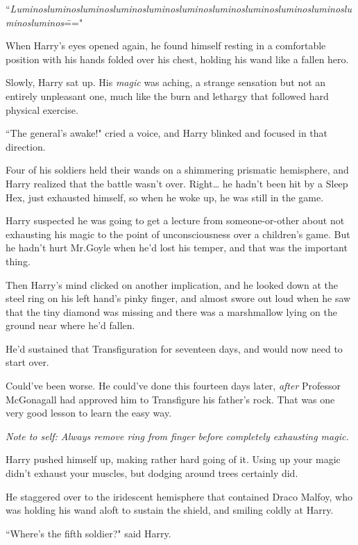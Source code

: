 ``\emph{Lu\-min\-os\-lu\-min\-os\-lu\-min\-os\-lu\-min\-os\-lu\-min\-os\-lu\-min\-os\-lu\-min\-os\-lu\-min\-os\-lu\-min\-os\-lu\-min\-os\-lu\-min\-os\-lu\-min\-os}\==="

\later

When Harry's eyes opened again, he found himself resting in a comfortable position with his hands folded over his chest, holding his wand like a fallen hero.

Slowly, Harry sat up. His \emph{magic} was aching, a strange sensation but not an entirely unpleasant one, much like the burn and lethargy that followed hard physical exercise.

``The general's awake!" cried a voice, and Harry blinked and focused in that direction.

Four of his soldiers held their wands on a shimmering prismatic hemisphere, and Harry realized that the battle wasn't over. Right{\ldots} he hadn't been hit by a Sleep Hex, just exhausted himself, so when he woke up, he was still in the game.

Harry suspected he was going to get a lecture from someone-or-other about not exhausting his magic to the point of unconsciousness over a children's game. But he hadn't hurt Mr.\?Goyle when he'd lost his temper, and that was the important thing.

Then Harry's mind clicked on another implication, and he looked down at the steel ring on his left hand's pinky finger, and almost swore out loud when he saw that the tiny diamond was missing and there was a marshmallow lying on the ground near where he'd fallen.

He'd sustained that Transfiguration for seventeen days, and would now need to start over.

Could've been worse. He could've done this fourteen days later, \emph{after} Professor McGonagall had approved him to Transfigure his father's rock. That was one very good lesson to learn the easy way.

\emph{Note to self: Always remove ring from finger before completely exhausting magic.}

Harry pushed himself up, making rather hard going of it. Using up your magic didn't exhaust your muscles, but dodging around trees certainly did.

He staggered over to the iridescent hemisphere that contained Draco Malfoy, who was holding his wand aloft to sustain the shield, and smiling coldly at Harry.

``Where's the fifth soldier?" said Harry.

